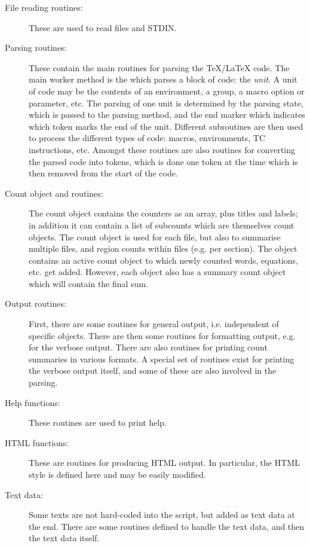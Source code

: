 \documentclass{article}
\begin{document}
\begin{description}
\item[File reading routines:] These are used to read files and STDIN.

\item[Parsing routines:] These contain the main routines for parsing the \TeX/\LaTeX{} code. The main worker method is the  which parses a block of code: the \emph{unit}. A unit of code may be the contents of an environment, a \code{\{\ldots\}} group, a macro option or parameter, etc. The parsing of one unit is determined by the parsing state, which is passed to the parsing method, and the end marker which indicates which token marks the end of the unit. Different subroutines are then used to process the different types of code: macros, environments, TC instructions, etc. Amongst these routines are also routines for converting the parsed code into tokens, which is done one token at the time which is then removed from the start of the code.

\item[Count object and routines:] The count object contains the counters as an array, plus titles and labels; in addition it can contain a list of subcounts which are themselves count objects. The count object is used for each file, but also to summarise multiple files, and region counts within files (e.g. per section). The  object contains an active count object to which newly counted words, equations, etc. get added. However, each  object also has a summary count object which will contain the final sum.

\item[Output routines:] First, there are some routines for general output, i.e. independent of specific  objects. There are then some routines for formatting output, e.g. for the verbose output. There are also routines for printing count summaries in various formats. A special set of routines exist for printing the verbose output itself, and some of these are also involved in the parsing.

\item[Help functions:] These routines are used to print help.

\item[HTML functions:] These are routines for producing HTML output. In particular, the HTML style is defined here and may be easily modified.

\item[Text data:] Some texts are not hard-coded into the script, but added as text data at the end. There are some routines defined to handle the text data, and then the text data itself.

\end{description}
\end{document}
